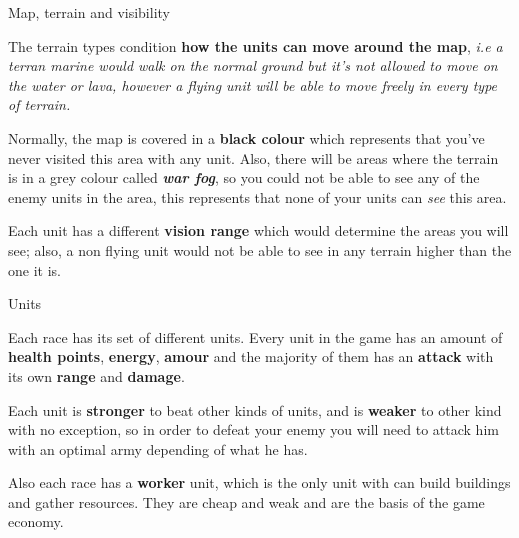 \documentclass[10pt]{beamer}
\begin{document}
\begin{frame}{Map, terrain and visibility}

The terrain types condition \textbf{how the units can move around the map}, \small{\textit{i.e a terran marine would walk on the normal ground but it's not allowed to move on the water or lava, however a flying unit will be able to move freely in every type of terrain.}} \newline

Normally, the map is covered in a \textbf{black colour} which represents that you've never visited this area with any unit. Also, there will be areas where the terrain is in a grey colour called \textbf{\textit{war fog}}, so you could not be able to see any of the enemy units in the area, this represents that none of your units can \textit{see} this area.\newline

Each unit has a different \textbf{vision range} which would determine the areas you will see; also, a non flying unit would not be able to see in any terrain higher than the one it is.
\end{frame}


\begin{frame}{Units}

Each race has its set of different units. Every unit in the game has an amount of \textbf{health points}, \textbf{energy}, \textbf{amour} and the majority of them has an \textbf{attack} with its own \textbf{range} and \textbf{damage}. \newline

Each unit is \textbf{stronger} to beat other kinds of units, and is \textbf{weaker} to other kind with no exception, so in order to defeat your enemy you will need to attack him with an optimal army depending of what he has. \newline

Also each race has a \textbf{worker} unit, which is the only unit with can build buildings and gather resources. They are cheap and weak and are the basis of the game economy.
\end{frame}
\end{document}
